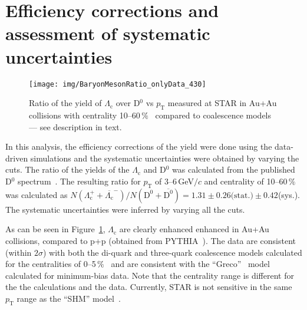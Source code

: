\section{Efficiency corrections and assessment of systematic uncertainties}

\begin{figure}[htb]
\centering %
\texttt{[image: img/BaryonMesonRatio\_onlyData\_430]}
\caption{\label{fig:ratio}Ratio of the yield of $\Lambda_\mathrm{c}$ over D$^0$ vs $p_\mathrm{T}$ measured at STAR in Au+Au collisions with centrality 10--60$\,\%$~\cite{GuannanLc} compared to coalescence models~\cite{LcCoalescence_OhKoLeeYasui, Ghosh_Lc_rescattering, SHM} --- see description in text.}

\end{figure}

In this analysis, the efficiency corrections of the yield were done using the data-driven simulations and the systematic uncertainties were obtained by varying the cuts. The ratio of the yields of the $\Lambda_\mathrm{c}$ and D$^0$ was calculated from the published D$^0$ spectrum~\cite{publishedDzero}. The resulting ratio for $p_\mathrm{T}$ of 3--6$\,$GeV$/c$ and centrality of 10--60$\,\%$ was calculated as $N(\Lambda_\mathrm{c}^+ + \overline{\Lambda_\mathrm{c}}^-)/N(\mathrm{D^0 + \overline{D^0}}) = 1.31 \pm 0.26\text{(stat.)} \pm 0.42$(sys.). The systematic uncertainties were inferred by varying all the cuts.


As can be seen in Figure~\ref{fig:ratio}, $\Lambda_\mathrm{c}$ are clearly enhanced enhanced in Au+Au collisions, compared to p+p (obtained from PYTHIA~\cite{PYTHIA}). The data are consistent (within $2\sigma$) with both the di-quark and three-quark coalescence models calculated for the centralities of 0--5$\,\%$~\cite{LcCoalescence_OhKoLeeYasui} and are consistent with the ``Greco''~\cite{Ghosh_Lc_rescattering} model calculated for minimum-bias data. Note that the centrality range is different for the the calculations and the data. Currently, STAR is not sensitive in the same $p_\mathrm{T}$ range as the ``SHM'' model~\cite{SHM}. 



% 




